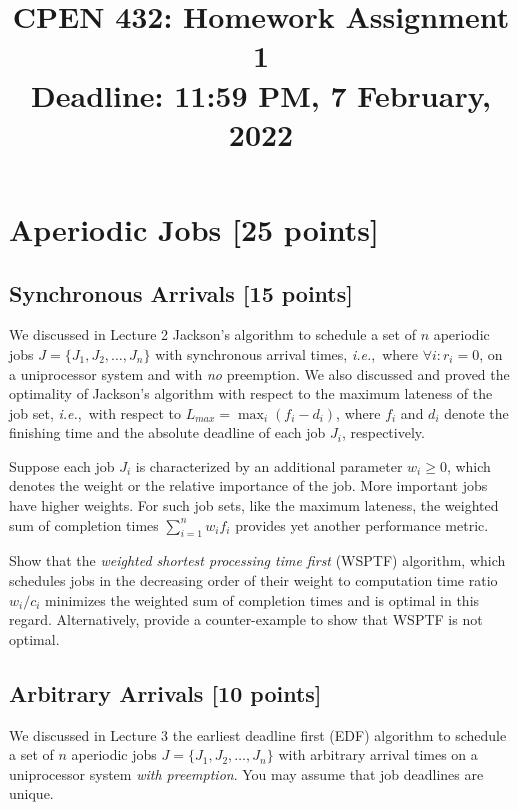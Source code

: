 \documentclass[12pt]{article}
\title{
  CPEN 432: Homework Assignment 1 \\
  \large
  Deadline: 11:59 PM, 7 February, 2022
}
\date{}
\newcommand{\ie}{{\textit{i.e.}}}
\begin{document}
\maketitle

\setlength{\baselineskip}{0.90\baselineskip}

\pagestyle{empty}

\section{Aperiodic Jobs [25 points]}

\subsection{Synchronous Arrivals [15 points]}
\label{sec:sync-arr}

We discussed in Lecture 2 Jackson's algorithm to schedule a set of $n$
aperiodic jobs $J=\{J_1, J_2, \ldots, J_n\}$ with synchronous arrival times,
\ie,~where $\forall i: r_i = 0$, on a uniprocessor system and with \textit{no}
preemption. We also discussed and proved the optimality of Jackson's algorithm
with respect to the maximum lateness of the job set, \ie,~with respect to
$L_{max} = \max_i(f_i - d_i)$, where $f_i$ and $d_i$ denote the finishing time
and the absolute deadline of each job $J_i$, respectively.

Suppose each job $J_i$ is characterized by an additional parameter $w_i \geq
0$, which denotes the weight or the relative importance of the job. More
important jobs have higher weights. For such job sets, like the maximum
lateness, the weighted sum of completion times $\sum_{i=1}^{n} w_i f_i$
provides yet another performance metric.

Show that the \textit{weighted shortest processing time first} (WSPTF)
algorithm, which schedules jobs in the decreasing order of their weight to
computation time ratio $w_i/c_i$ minimizes the weighted sum of completion times
and is optimal in this regard. Alternatively, provide a counter-example to show
that WSPTF is not optimal.

\subsection{Arbitrary Arrivals [10 points]}
We discussed in Lecture 3 the earliest deadline first (EDF)
algorithm to schedule a set of $n$ aperiodic jobs $J=\{J_1, J_2, \ldots, J_n\}$
with arbitrary arrival times on a uniprocessor system \textit{with preemption}.
You may assume that job deadlines are unique.
\end{document}
